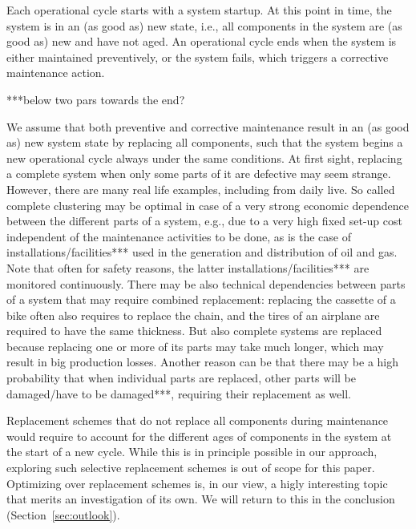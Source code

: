 \documentclass[authoryear]{elsarticle}
\def\tnow{t_\text{now}}
\newcommand{\tausnow}{\tau_*^{(\tnow)}}
\begin{document}
Each operational cycle starts with a system startup.
At this point in time, the system is in an (as good as) new state,
i.e., all components in the system are (as good as) new and have not aged.
An operational cycle ends when the system is either maintained preventively, %
or the system fails, which triggers a corrective maintenance action.

***below two pars towards the end? 

We assume that both preventive and corrective maintenance result in an (as good as) new system state by replacing all components,
such that the system begins a new operational cycle always under the same conditions.
At first sight, replacing a complete system when only some parts of it are defective may seem strange.
However, there are many real life examples, including from daily live.
So called complete clustering \citep{2017:oldekeizer}
may be optimal in case of a very strong economic dependence between the different parts of a system,
e.g., due to a very high fixed set-up cost independent of the maintenance activities to be done,
as is the case of installations/facilities*** used in the generation and distribution of oil and gas.
Note that often for safety reasons, the latter installations/facilities*** are monitored continuously.
There may be also technical dependencies between parts of a system that may require combined replacement:
replacing the cassette of a bike often also requires to replace the chain,
and the tires of an airplane are required to have the same thickness.
But also complete systems are replaced because replacing one or more of its parts may take much longer,
which may result in big production losses.
Another reason can be that there may be a high probability that when individual parts are replaced,
other parts will be damaged/have to be damaged***, requiring their replacement as well.

Replacement schemes that do not replace all components during maintenance
would require to account for the different ages of components in the system
at the start of a new cycle.
While this is in principle possible in our approach,
exploring such selective replacement schemes is out of scope for this paper.
Optimizing over replacement schemes is, in our view, a higly interesting topic that merits an investigation of its own.
We will return to this in the conclusion (Section~\ref{sec:outlook}).
\end{document}
